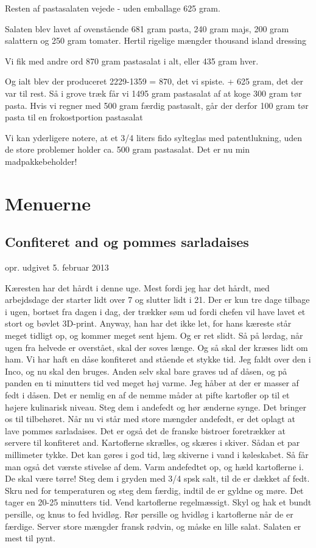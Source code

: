 \documentclass[
]{book}
\begin{document}
Resten af pastasalaten vejede - uden emballage 625 gram.

Salaten blev lavet af ovenstående 681 gram pasta, 240 gram
majs, 200 gram salattern og 250 gram tomater. Hertil rigelige
mængder thousand island dressing

Vi fik med andre ord 870 gram pastasalat i alt, eller 435 gram hver.

Og ialt blev der produceret
2229-1359 = 870, det vi spiste.
+ 625 gram, det der var til rest.
Så i grove træk får vi 1495 gram pastasalat af at koge 300 gram
tør pasta. Hvis vi regner med 500 gram færdig pastasalt,
går der derfor 100 gram tør pasta til en frokostportion pastasalat

Vi kan yderligere notere, at et 3/4 liters fido sylteglas med
patentlukning, uden de store problemer holder ca. 500 gram
pastasalat. Det er nu min madpakkebeholder!

\hypertarget{menuerne}{%
\chapter{Menuerne}\label{menuerne}}

\hypertarget{confiteret-and-og-pommes-sarladaises}{%
\section{Confiteret and og pommes sarladaises}\label{confiteret-and-og-pommes-sarladaises}}

opr. udgivet 5. februar 2013

Kæresten har det hårdt i denne uge. Mest fordi jeg har det hårdt, med arbejdsdage der starter lidt over 7 og slutter lidt i 21. Der er kun tre dage tilbage i ugen, bortset fra dagen i dag, der trækker søm ud fordi chefen vil have lavet et stort og bøvlet 3D-print. Anyway, han har det ikke let, for hans kæreste står meget tidligt op, og kommer meget sent hjem. Og er ret slidt.
Så på lørdag, når ugen fra helvede er overstået, skal der soves længe. Og så skal der kræses lidt om ham.
Vi har haft en dåse konfiteret and stående et stykke tid. Jeg faldt over den i Inco, og nu skal den bruges. Anden selv skal bare graves ud af dåsen, og på panden en ti minutters tid ved meget høj varme.
Jeg håber at der er masser af fedt i dåsen. Det er nemlig en af de nemme måder at pifte kartofler op til et højere kulinarisk niveau. Steg dem i andefedt og hør ænderne synge.
Det bringer os til tilbehøret. Når nu vi står med store mængder andefedt, er det oplagt at lave pommes sarladaises. Det er også det de franske bistroer foretrækker at servere til konfiteret and.
Kartoflerne skrælles, og skæres i skiver. Sådan et par millimeter tykke. Det kan gøres i god tid, læg skiverne i vand i køleskabet. Så får man også det værste stivelse af dem.
Varm andefedtet op, og hæld kartoflerne i. De skal være tørre! Steg dem i gryden med 3/4 spsk salt, til de er dækket af fedt. Skru ned for temperaturen og steg dem færdig, indtil de er gyldne og møre. Det tager en 20-25 minutters tid. Vend kartoflerne regelmæssigt.
Skyl og hak et bundt persille, og knus to fed hvidløg. Rør persille og hvidløg i kartoflerne når de er færdige.
Server store mængder fransk rødvin, og måske en lille salat. Salaten er mest til pynt.
\end{document}
